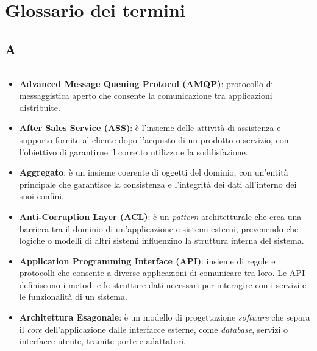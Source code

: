 \chapter{Glossario dei termini}
\newenvironment{glossaryitemize}
  {\begin{itemize}[label={}, leftmargin=*]}
  {\end{itemize}}

\section*{A}
{\color{lightgray}\rule{\textwidth}{0.4pt}} %
\begin{glossaryitemize}
    \item \textbf{Advanced Message Queuing Protocol (AMQP)}: protocollo di messaggistica aperto che consente la comunicazione tra applicazioni distribuite.
    \item \textbf{After Sales Service (ASS)}: è l'insieme delle attività di assistenza e supporto fornite al cliente dopo l'acquisto di un prodotto o servizio, con l'obiettivo di garantirne il corretto utilizzo e la soddisfazione.
    \item \textbf{Aggregato}: è un insieme coerente di oggetti del dominio, con un'entità principale che garantisce la consistenza e l'integrità dei dati all'interno dei suoi confini.
    \item \textbf{Anti-Corruption Layer (ACL)}: è un \textit{pattern} architetturale che crea una barriera tra il dominio di un'applicazione e sistemi esterni, prevenendo che logiche o modelli di altri sistemi influenzino la struttura interna del sistema.
    \item \textbf{Application Programming Interface (API)}: insieme di regole e protocolli che consente a diverse applicazioni di comunicare tra loro. Le API definiscono i metodi e le strutture dati necessari per interagire con i servizi e le funzionalità di un sistema.
    \item \textbf{Architettura Esagonale}: è un modello di progettazione \textit{software} che separa il \textit{core} dell'applicazione dalle interfacce esterne, come \textit{database}, servizi o interfacce utente, tramite porte e adattatori.
\end{glossaryitemize}

